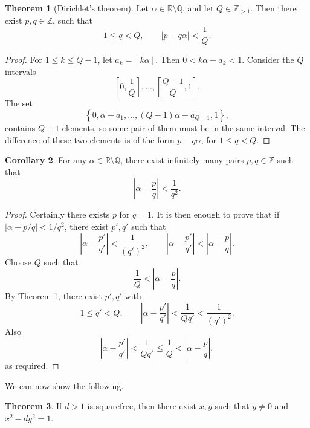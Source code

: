 \documentclass{article}
\newcommand{\Z}{\mathbb{Z}}
\newcommand{\Q}{\mathbb{Q}}
\newcommand{\R}{\mathbb{R}}
\newcommand{\rb}[1]{\left( #1 \right)}
\renewcommand{\sb}[1]{\left[ #1 \right]}
\newcommand{\cb}[1]{\left\{ #1 \right\}}
\newcommand{\abs}[1]{\left\lvert #1 \right\rvert}
\newcommand{\fb}[1]{\left\lfloor #1 \right\rfloor}
\theoremstyle{definition}\newtheorem{definition}{Definition}
\theoremstyle{definition}\newtheorem{remark}[definition]{Remark}
\theoremstyle{definition}\newtheorem*{example}{Example}
\theoremstyle{definition}\newtheorem*{note}{Note}
\newtheorem{theorem}[definition]{Theorem}
\newtheorem{corollary}[definition]{Corollary}
\begin{document}
\begin{theorem}[Dirichlet's theorem]
\label{thm:65}
Let $ \alpha \in \R \setminus \Q $, and let $ Q \in \Z_{> 1} $. Then there exist $ p, q \in \Z $, such that
$$ 1 \le q < Q, \qquad \abs{p - q\alpha} < \dfrac{1}{Q}. $$
\end{theorem}

\begin{proof}
For $ 1 \le k \le Q - 1 $, let $ a_k = \fb{k\alpha} $. Then $ 0 < k\alpha - a_k < 1 $. Consider the $ Q $ intervals
$$ \sb{0, \dfrac{1}{Q}}, \dots, \sb{\dfrac{Q - 1}{Q}, 1}. $$
The set
$$ \cb{0, \alpha - a_1, \dots, \rb{Q - 1}\alpha - a_{Q - 1}, 1}, $$
contains $ Q + 1 $ elements, so some pair of them must be in the same interval. The difference of these two elements is of the form $ p - q\alpha $, for $ 1 \le q < Q $.
\end{proof}

\begin{corollary}
\label{cor:66}
For any $ \alpha \in \R \setminus \Q $, there exist infinitely many pairs $ p, q \in \Z $ such that
$$ \abs{\alpha - \dfrac{p}{q}} < \dfrac{1}{q^2}. $$
\end{corollary}

\begin{proof}
Certainly there exists $ p $ for $ q = 1 $. It is then enough to prove that if $ \abs{\alpha - p / q} < 1 / q^2 $, there exist $ p', q' $ such that
$$ \abs{\alpha - \dfrac{p'}{q'}} < \dfrac{1}{\rb{q'}^2}, \qquad \abs{\alpha - \dfrac{p'}{q'}} < \abs{\alpha - \dfrac{p}{q}}. $$
Choose $ Q $ such that
$$ \dfrac{1}{Q} < \abs{\alpha - \dfrac{p}{q}}. $$
By Theorem \ref{thm:65}, there exist $ p', q' $ with
$$ 1 \le q' < Q, \qquad \abs{\alpha - \dfrac{p'}{q'}} < \dfrac{1}{Qq'} < \dfrac{1}{\rb{q'}^2}. $$
Also
$$ \abs{\alpha - \dfrac{p'}{q'}} < \dfrac{1}{Qq'} \le \dfrac{1}{Q} < \abs{\alpha - \dfrac{p}{q}}, $$
as required.
\end{proof}

We can now show the following.

\begin{theorem}
If $ d > 1 $ is squarefree, then there exist $ x, y $ such that $ y \ne 0 $ and $ x^2 - dy^2 = 1 $.
\end{theorem}
\end{document}
